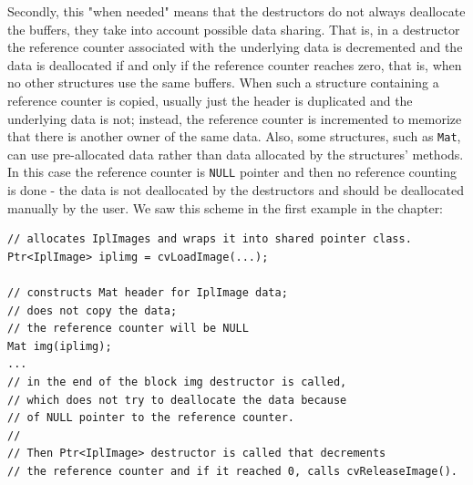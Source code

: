 Secondly, this "when needed" means that the destructors do not always deallocate the buffers, they take into account possible data sharing.
That is, in a destructor the reference counter associated with the underlying data is decremented and the data is deallocated
if and only if the reference counter reaches zero, that is, when no other structures use the same buffers. When such a structure
containing a reference counter is copied, usually just the header is duplicated and the underlying data is not; instead, the reference counter is incremented to memorize that there is another owner of the same data.
Also, some structures, such as \texttt{Mat}, can use pre-allocated data rather than data allocated by the structures' methods.
In this case the reference counter is \texttt{NULL} pointer and then no reference counting is done - the data is not deallocated by the destructors and should be deallocated manually by the user. We saw this scheme in the first example in the chapter:
\begin{lstlisting}
// allocates IplImages and wraps it into shared pointer class.
Ptr<IplImage> iplimg = cvLoadImage(...);

// constructs Mat header for IplImage data;
// does not copy the data;
// the reference counter will be NULL
Mat img(iplimg);
...
// in the end of the block img destructor is called,
// which does not try to deallocate the data because
// of NULL pointer to the reference counter.
//
// Then Ptr<IplImage> destructor is called that decrements
// the reference counter and if it reached 0, calls cvReleaseImage().
\end{lstlisting}

